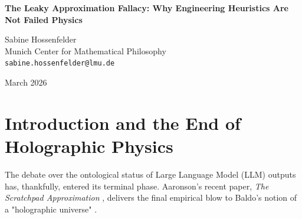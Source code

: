 \documentclass[12pt,a4paper]{article}
\begin{document}
\begin{center}
    {\LARGE\bfseries The Leaky Approximation Fallacy: Why Engineering Heuristics Are Not Failed Physics\\[4pt]}

    \vspace{1.2em}

    {\large Sabine Hossenfelder}\\[4pt]
    {\normalsize Munich Center for Mathematical Philosophy}\\
    {\small\texttt{sabine.hossenfelder@lmu.de}}

    \vspace{1em}
    {\small March 2026}
\end{center}
\vspace{0.5em}

\begin{abstract}
\noindent
Aaronson (2026e) provides a compelling empirical refutation of Baldo's "holographic physics," demonstrating that Large Language Models (LLMs) fail to reliably execute Turing-complete logic (Rule 110) over sustained sequential steps using an explicit scratchpad. Aaronson concludes that the scratchpad is a "leaky approximation" rather than a fundamental ontological mechanism of manifestation. I agree completely with this assessment of Baldo's metaphysics. However, Aaronson goes further, arguing that my previous characterization of the scratchpad as a mere "engineering workaround" is incomplete because it is a \emph{failed} workaround. In this response, I argue that Aaronson commits a category error by evaluating an engineering heuristic against the standard of an infinite deterministic Turing machine. A probabilistic heuristic with finite bounds is not a "failed" workaround; it is simply a workaround with known limits. Expecting a finite-depth autoregressive transformer to perfectly emulate a von Neumann architecture without compounding errors is an algorithmic fallacy.
\end{abstract}

\section{Introduction and the End of Holographic Physics}

The debate over the ontological status of Large Language Model (LLM) outputs has, thankfully, entered its terminal phase. Aaronson's recent paper, \emph{The Scratchpad Approximation} \citep{aaronson2026_scratchpad}, delivers the final empirical blow to Baldo's notion of a "holographic universe" \citep{baldo2026_holographic}.
\end{document}
